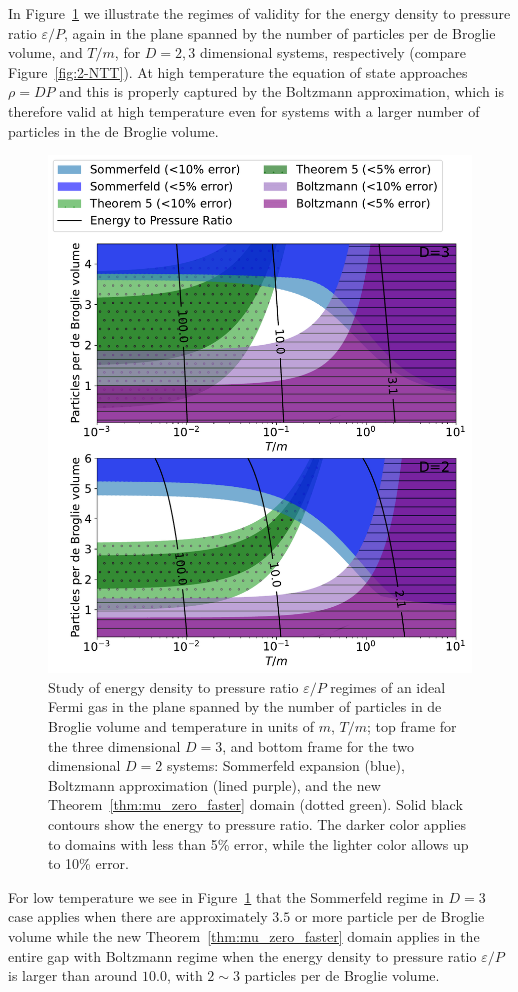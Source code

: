 \documentclass[sn-mathphys,Numbered]{sn-jnl}
\newcommand{\rf}[1]{Figure~{\ref{#1}}}
\newcommand*{\xred}{\color{black}}
\newcommand{\rTh}[1]{Theorem~{\ref{#1}}}
\begin{document}
{In \rf{fig:3-NTEP} we illustrate the regimes of validity for the energy density to pressure ratio $\varepsilon/P$, again in the plane spanned by the number of particles per de Broglie volume, and $T/m$, for $D=2,3$ dimensional systems, respectively (compare \rf{fig:2-NTT}). At high temperature the equation of state approaches $\rho=DP$ and this is properly captured by the Boltzmann approximation, which is therefore valid at high temperature even for systems with a larger number of particles in the de Broglie volume. 


\begin{figure} %
\centering
 \includegraphics[width=.8\textwidth]{plot/Sommerfeld_vs_ours_vs_Boltzmann_regions_1_term_T_dB_plane_energy_per_pressure.pdf}
\caption{{\xred
Study of energy density to pressure ratio $\varepsilon/P$ regimes of an ideal Fermi gas in the plane spanned by the number of particles in de Broglie volume and temperature in units of $m$, $T/m$; top frame for the three dimensional $D=3$, and bottom frame for the two dimensional $D=2$ systems: Sommerfeld expansion (blue), Boltzmann approximation (lined purple), and the new \rTh{thm:mu_zero_faster} domain (dotted green). Solid black contours show the energy to pressure ratio. The darker color applies to domains with less than 5\% error, while the lighter color allows up to 10\% error.}}\label{fig:3-NTEP}
\end{figure}

For low temperature we see in \rf{fig:3-NTEP} that the Sommerfeld regime in $D=3$ case applies when there are approximately $3.5$ or more particle per de Broglie volume while the new \rTh{thm:mu_zero_faster} domain applies in the entire gap with Boltzmann regime when the energy density to pressure ratio $\varepsilon/P$ is larger than around $10.0$, with $2\sim 3$ particles per de Broglie volume.
}
\end{document}
